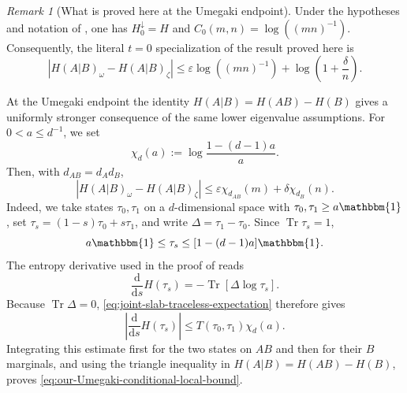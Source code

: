 \documentclass[11pt]{article}
\theoremstyle{remark}
\newtheorem{remark}[remark]{Remark}
\newcommand{\1}{\mathbbm{1}}
\begin{document}
\begin{remark}[What is proved here at the Umegaki endpoint]
\label{rem:our-Umegaki-conditional-lower-eigenvalue-bound}
Under the hypotheses and notation of
, one has
$H_0^\downarrow=H$ and
$C_0(m,n)=\log((mn)^{-1})$.  Consequently, the literal $t=0$
specialization of the result proved here is
\begin{equation}
 \left|H(A|B)_\omega-H(A|B)_\zeta\right|
 \leq
 \varepsilon\log((mn)^{-1})
 +\log\left(1+\frac{\delta}{n}\right).
 \label{eq:our-Umegaki-conditional-general-specialization}
\end{equation}

At the Umegaki endpoint the identity
$H(A|B)=H(AB)-H(B)$ gives a uniformly stronger consequence of the
same lower eigenvalue assumptions.  For $0<a\leq d^{-1}$, we set
\begin{equation}
 \chi_d(a):=\log\frac{1-(d-1)a}{a}.
 \label{eq:Umegaki-entropy-local-constant}
\end{equation}
Then, with $d_{AB}=d_Ad_B$,
\begin{equation}
 \boxed{
 \left|H(A|B)_\omega-H(A|B)_\zeta\right|
 \leq
 \varepsilon\chi_{d_{AB}}(m)
 +\delta\chi_{d_B}(n).}
 \label{eq:our-Umegaki-conditional-local-bound}
\end{equation}
Indeed, we take states $\tau_0,\tau_1$ on a $d$-dimensional space with
$\tau_0,\tau_1\geq a\1$, set
$\tau_s=(1-s)\tau_0+s\tau_1$, and write
$\Delta=\tau_1-\tau_0$.  Since $\operatorname{Tr}\tau_s=1$,
\begin{equation}
 a\1\leq\tau_s\leq[1-(d-1)a]\1.
\end{equation}
The entropy derivative used in the proof of
 reads
\begin{equation}
 \frac{\mathrm d}{\mathrm ds}H(\tau_s)
 =-\operatorname{Tr}[\Delta\log\tau_s].
\end{equation}
Because $\operatorname{Tr}\Delta=0$,
\eqref{eq:joint-slab-traceless-expectation} therefore gives
\begin{equation}
 \left|\frac{\mathrm d}{\mathrm ds}H(\tau_s)\right|
 \leq T(\tau_0,\tau_1)\chi_d(a).
\end{equation}
Integrating this estimate first for the two states on $AB$ and then
for their $B$ marginals, and using the triangle inequality in
$H(A|B)=H(AB)-H(B)$, proves
\eqref{eq:our-Umegaki-conditional-local-bound}.


\end{remark}
\end{document}
